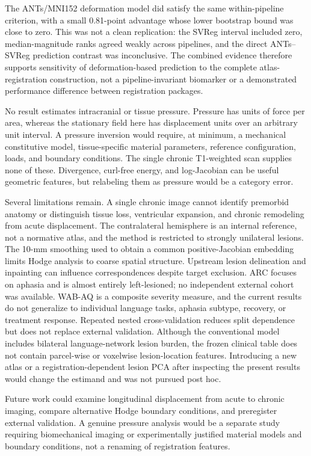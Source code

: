 \documentclass[11pt]{article}
\begin{document}
The ANTs/MNI152 deformation model did satisfy the same within-pipeline
criterion, with a small 0.81-point advantage whose lower bootstrap bound was
close to zero. This was not a clean replication: the SVReg interval included
zero, median-magnitude ranks agreed weakly across pipelines, and the direct
ANTs--SVReg prediction contrast was inconclusive. The combined evidence
therefore supports sensitivity of deformation-based prediction to the complete
atlas-registration construction, not a pipeline-invariant biomarker or a
demonstrated performance difference between registration packages.

No result estimates intracranial or tissue pressure. Pressure has units of force
per area, whereas the stationary field here has displacement units over an
arbitrary unit interval. A pressure inversion would require, at minimum, a
mechanical constitutive model, tissue-specific material parameters, reference
configuration, loads, and boundary conditions. The single chronic T1-weighted
scan supplies none of these. Divergence, curl-free energy, and log-Jacobian can
be useful geometric features, but relabeling them as pressure would be a
category error.

Several limitations remain. A single chronic image cannot identify premorbid
anatomy or distinguish tissue loss, ventricular expansion, and chronic
remodeling from acute displacement. The contralateral hemisphere is an internal
reference, not a normative atlas, and the method is restricted to strongly
unilateral lesions. The 10-mm smoothing used to obtain a common
positive-Jacobian embedding limits Hodge analysis to coarse spatial structure.
Upstream lesion delineation and inpainting can influence correspondences despite
target exclusion. ARC focuses on aphasia and is almost entirely left-lesioned;
no independent external cohort was available. WAB-AQ is a composite severity
measure, and the current results do not generalize to individual language
tasks, aphasia subtype, recovery, or treatment response. Repeated nested
cross-validation reduces split dependence but does not replace external
validation. Although the conventional model includes bilateral language-network
lesion burden, the frozen clinical table does not contain parcel-wise or
voxelwise lesion-location features. Introducing a new atlas or a
registration-dependent lesion PCA after inspecting the present results would
change the estimand and was not pursued post hoc.

Future work could examine longitudinal displacement from acute to chronic
imaging, compare alternative Hodge boundary conditions, and preregister
external validation. A genuine pressure analysis would be a separate study
requiring biomechanical imaging or experimentally justified material models and
boundary conditions, not a renaming of registration features.
\end{document}
